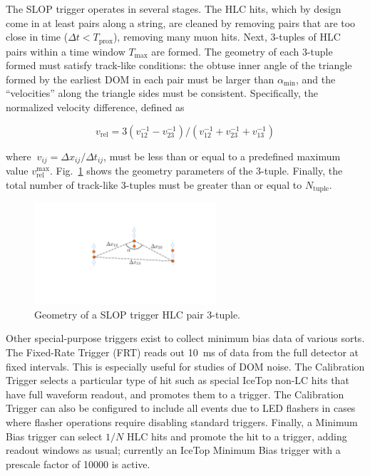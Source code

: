 The SLOP trigger operates in several stages.  The HLC hits, which by design
come in at least pairs along a string, are cleaned by removing pairs that
are too close in time ($\Delta t < T_{\mathrm{prox}}$), removing many muon
hits.  Next, 3-tuples of HLC pairs within a time window $T_{\mathrm{max}}$
are formed.  The geometry of each 3-tuple formed must satisfy track-like
conditions: the obtuse inner angle of the triangle formed by the earliest
DOM in each pair must be larger than $\alpha_{\mathrm{min}}$, and the
``velocities'' along the triangle sides must be consistent.  Specifically,
the normalized velocity difference, defined as

\begin{equation}
  v_{\mathrm{rel}} = 3(v^{-1}_{12} - v^{-1}_{23})/(v^{-1}_{12} +
  v^{-1}_{23} + v^{-1}_{13})
\end{equation}

\noindent where $\ v_{ij} = \Delta x_{ij}/\Delta t_{ij}$, must be less than
or equal to a predefined maximum value
$v_{\mathrm{rel}}^{\mathrm{max}}$.  Fig.~\ref{fig:slop} shows the geometry
parameters of the 3-tuple.  Finally, the total number of track-like 3-tuples
must be greater than or equal to $N_{\mathrm{tuple}}$. 

\begin{figure}[!ht]
 \centering
 \includegraphics[width=0.6\textwidth]{graphics/online/trigger/slop.pdf}
 \caption{Geometry of a SLOP trigger HLC pair 3-tuple.}
 \label{fig:slop}
\end{figure}

Other special-purpose triggers exist to collect minimum bias data of
various sorts.  The Fixed-Rate Trigger (FRT) reads out 10~ms of data from
the full detector at fixed intervals.  This is especially useful for studies
of DOM noise.  The Calibration Trigger selects a particular type of hit
such as special IceTop non-LC hits that have full waveform readout, and promotes
them to a trigger. The Calibration Trigger can also be configured to
include all events due to LED flashers in cases where flasher 
operations require disabling standard triggers. Finally, a Minimum Bias
trigger can select $1/N$ HLC hits and promote the hit to a trigger, adding
readout windows as usual; currently an IceTop Minimum Bias trigger with a
prescale factor of 10000 is active.

